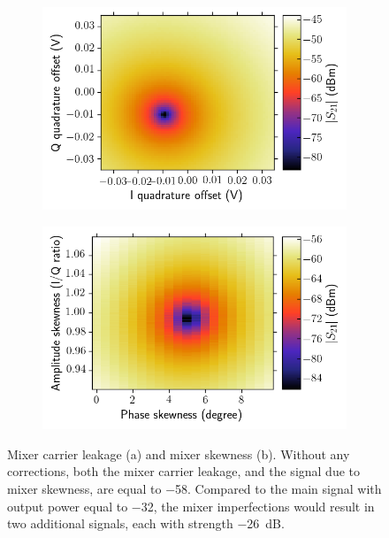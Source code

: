         \begin{figure}[tb]
          \centering
          \begin{subfigure}[h]{0.49\textwidth}
            \caption{}
            \includegraphics[width=\textwidth]{Figures/Calibration routines/Mixer offset.png}
          \end{subfigure}
          \begin{subfigure}[h]{0.49\textwidth}
            \caption{}
            \includegraphics[width=\textwidth]{Figures/Calibration routines/Mixer skewness.png}
          \end{subfigure}
          \caption{Mixer carrier leakage (a) and mixer skewness (b). Without any corrections, both the mixer carrier leakage, and the signal due to mixer skewness, are equal to \SI{-58}{\dBm}. Compared to the main signal with output power equal to \SI{-32}{\dBm}, the mixer imperfections would result in two additional signals, each with strength \SI{-26}{\dB}.}
          \label{fig:Mixer calibrations 2D}
        \end{figure}

